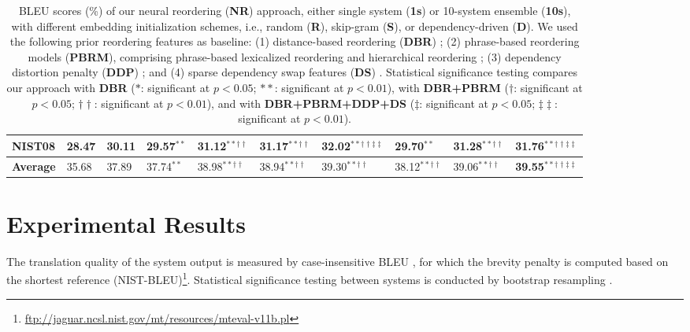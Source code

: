 \documentclass[letterpaper]{article}
\begin{document}
\begin{table}[ht]
\begin{tabular}{|l|l|l||l|l||l|l|l|l|l|}
{\bf NIST08} & 28.47 & 30.11 & 29.57$^{**}$ & 31.12$^{**\dagger\dagger}$ & 31.17$^{**\dagger\dagger}$ & 32.02$^{**\dagger\dagger\ddagger\ddagger}$ & 29.70$^{**}$ & 31.28$^{**\dagger\dagger}$ & 31.76$^{**\dagger\dagger\ddagger\ddagger}$\\\hline
\hline
{\bf Average} & 35.68 & 37.89 & 37.74$^{**}$ & 38.98$^{**\dagger\dagger}$ & 38.94$^{**\dagger\dagger}$ & 39.30$^{**\dagger\dagger}$ & 38.12$^{**\dagger\dagger}$ & 39.06$^{**\dagger\dagger}$ & {\bf 39.55}$^{**\dagger\dagger\ddagger\ddagger}$\\\hline
\end{tabular}
\caption{\label{tab:mainresult} BLEU scores (\%) of our neural reordering ({\bf NR}) approach, either single system ({\bf 1s}) or 10-system ensemble ({\bf 10s}), with different embedding initialization schemes, i.e., random ({\bf R}), skip-gram ({\bf S}), or dependency-driven ({\bf D}). We used the following prior reordering features as baseline: (1) distance-based reordering ({\bf DBR}) \cite{koehn_statistical_2003}; (2) phrase-based reordering models ({\bf PBRM}), comprising phrase-based lexicalized reordering \cite{tillmann_unigram_2004,koehn_edinburgh_2005} and hierarchical reordering \cite{galley_simple_2008}; (3) dependency distortion penalty ({\bf DDP}) \cite{cherry_cohesive_2008}; and (4) sparse dependency swap features ({\bf DS}) \cite{hadiwinoto_swap_2016}. Statistical significance testing compares our approach with {\bf DBR} ($*$: significant at $p < 0.05$; $**$: significant at $p < 0.01$), with {\bf DBR+PBRM} ($\dagger$: significant at $p < 0.05$; $\dagger\dagger$: significant at $p < 0.01$), and with {\bf DBR+PBRM+DDP+DS} ($\ddagger$: significant at $p < 0.05$; $\ddagger\ddagger$: significant at $p < 0.01$).}
\end{table}

\section{Experimental Results}

The translation quality of the system output is measured by case-insensitive BLEU \cite{papineni_bleu:_2002}, for which the brevity penalty is computed based on the shortest reference (NIST-BLEU)\footnote{\url{ftp://jaguar.ncsl.nist.gov/mt/resources/mteval-v11b.pl}}. Statistical significance testing between systems is conducted by bootstrap resampling \cite{koehn_statistical_2004}.
\end{document}
